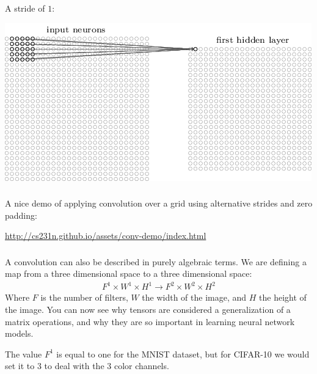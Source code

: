 \documentclass[xetex,mathserif,serif,aspectratio=169]{beamer}
\begin{document}
\begin{frame}[fragile] \frametitle{} \oldB \small

A stride of $1$:

\begin{center}
\includegraphics[height=0.7\textheight]{img/tikz45.png}
\end{center}

\end{frame}

\begin{frame}[fragile] \frametitle{} \oldB \small

A nice demo of applying convolution over a grid using alternative
strides and zero padding:

\begin{center}
\url{http://cs231n.github.io/assets/conv-demo/index.html}
\end{center}

\end{frame}

\begin{frame}[fragile] \frametitle{} \oldB \small

\textbf{}

A convolution can also be described in purely algebraic
terms. We are defining a map from a three dimensional space
to a three dimensional space:
\begin{align*}
F^1 \times W^1 \times H^1 \rightarrow F^2 \times W^2 \times H^2
\end{align*}
Where $F$ is the number of filters, $W$ the width of the image,
and $H$ the height of the image. You can now see why tensors are
considered a generalization of a matrix operations, and why they
are so important in learning neural network models.

\pause The value $F^1$ is equal to one for the MNIST dataset, but
for CIFAR-10 we would set it to $3$ to deal with the $3$ color
channels.

\end{frame}
\end{document}
